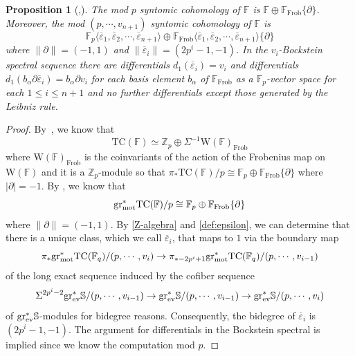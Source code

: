 \documentclass[english,10pt]{amsart}
\newcommand{\field}{\mathbb{F}}
\newtheorem{prop}{Proposition}[section]
\theoremstyle{definition}
\numberwithin{equation}{section}
\newcommand{\grmot}{\mathrm{gr}_{\textup{mot}}^*}
\begin{document}
\begin{prop}[{\cite{HM97},\cite{bhatt2019thhandintegralpadichodge}}]\label{syntomic field}
The mod $p$ syntomic cohomology of $\field$ is $\mathbb{F}\oplus \field_{\mathrm{Frob}}\{\partial\}$. Moreover, the mod 
$(p,\cdots ,v_{n+1})$ syntomic cohomology of $\field$ is 
\[ 
\mathbb{F}_p\langle \overline{\varepsilon}_1,\overline{\varepsilon}_2,\cdots ,\overline{\varepsilon}_{n+1} \rangle \oplus \mathbb{F}_{\mathrm{Frob}}\langle \overline{\varepsilon}_1,\overline{\varepsilon}_2,\cdots ,\overline{\varepsilon}_{n+1} \rangle \{\partial\}
\] 
where $\|\partial\|=(-1,1)$ and $\|\overline{\varepsilon}_i\|=(2p^i-1,-1)$. 
In the $v_i$-Bockstein spectral sequence there are differentials $d_1(\overline{\varepsilon}_i)=v_i$ and differentials $d_1(b_{\alpha}\partial\overline{\varepsilon}_i)=b_{\alpha}\partial v_i$ for each basis element $b_{\alpha}$ of $\mathbb{F}_{\mathrm{Frob}}$ as a $\mathbb{F}_p$-vector space
for each $1\leq i\leq n+1$ and no further differentials except those generated by the Leibniz rule.
\end{prop}
\begin{proof}
By~\cite[Theorem~B]{HM97}, we know that 
\[ \mathrm{TC}(\field)\simeq \mathbb{Z}_p\oplus \Sigma^{-1}\mathrm{W}(\field)_{\mathrm{Frob}}\]
where $\mathrm{W}(\field)_{\mathrm{Frob}}$ is the coinvariants of the action of the Frobenius map on $\mathrm{W}(\field)$ 
and it is a $\mathbb{Z}_p$-module so that 
$\pi_*\mathrm{TC}(\field)/p\cong \mathbb{F}_p\oplus \field_{\mathrm{Frob}}\{\partial\}$ where $|\partial|=-1$. By \cite[\S~6]{bhatt2019thhandintegralpadichodge}, we know that 
\[ 
\grmot\mathrm{TC}(\field)/p\cong \mathbb{F}_p\oplus \mathbb{F}_{\mathrm{Frob}}\{\partial\}
\]
where $\|\partial \|=(-1,1)$. 
By \autoref{Z-algebra} and \autoref{def:epsilon}, we can determine that there is a unique class, which we call 
$\overline{\varepsilon}_i$, that maps to $1$ via the boundary map
\[ 
\pi_*\grmot\mathrm{TC}(\field_q)/(p,\cdots ,v_{i})\to \pi_{*-2p^i+1}\grmot\mathrm{TC}(\field_q)/(p,\cdots ,v_{i-1})
\]
of the long exact sequence induced by the cofiber sequence 
\[ \Sigma^{2p^i-2}\mathrm{gr}_{\textup{ev}}^*\mathbb{S}/(p,\cdots ,v_{i-1})\to \mathrm{gr}_{\textup{ev}}^*\mathbb{S}/(p,\cdots ,v_{i-1})\to \mathrm{gr}_{\textup{ev}}^*\mathbb{S}/(p,\cdots ,v_{i})
\]
of $\mathrm{gr}_{\textup{ev}}^*\mathbb{S}$-modules for bidegree reasons. Consequently, the bidegree of $\overline{\varepsilon}_i$ is $(2p^i-1,-1)$. The argument for differentials in the Bockstein spectral is implied since we know the computation mod $p$. 
\end{proof}
\end{document}
